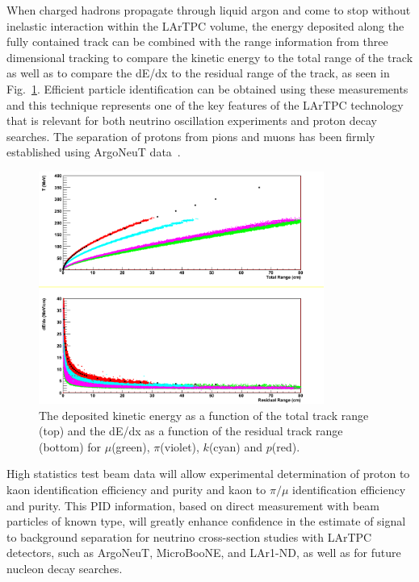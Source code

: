 \documentclass[DIV=calc, paper=a4, fontsize=10pt, twocolumn]{scrartcl}	 %
\begin{document}
{When charged hadrons propagate through liquid argon and come to stop without inelastic interaction within the LArTPC volume, the energy deposited along the fully contained track can be combined with the range information from three dimensional tracking to compare the kinetic energy to the total range of the track as well as to compare the dE/dx to the residual range of the track, as seen in Fig.~\ref{fig:en-range-corr}. Efficient particle identification can be obtained using these measurements and this technique represents one of the key features of the LArTPC technology that is relevant for both neutrino oscillation experiments and proton decay searches. The separation of protons from pions and muons has been firmly established using ArgoNeuT data~\cite{argoneut_recomb}.  
\begin{figure}[!h]
\begin{centering}
\includegraphics[height=3.0in]{Figures/T_vs_TotRange}
\vspace{-0.5cm}
\caption{
{\scriptsize \sf  The deposited kinetic energy as a function of the total track range (top) and the dE/dx as a function of the residual track range (bottom) for $\mu$(green), $\pi$(violet), $k$(cyan) and $p$(red). }
}
\label{fig:en-range-corr}
\end{centering}
\end{figure}

High statistics test beam data will allow experimental determination of proton to kaon identification efficiency and purity and 
kaon to $\pi/\mu$ identification efficiency and purity. This PID information, based on direct measurement with beam particles of known type, will greatly enhance confidence in the estimate of signal to background separation for neutrino cross-section studies with LArTPC detectors, such as ArgoNeuT, MicroBooNE, and LAr1-ND, as well as for future nucleon decay searches.

}
\end{document}
